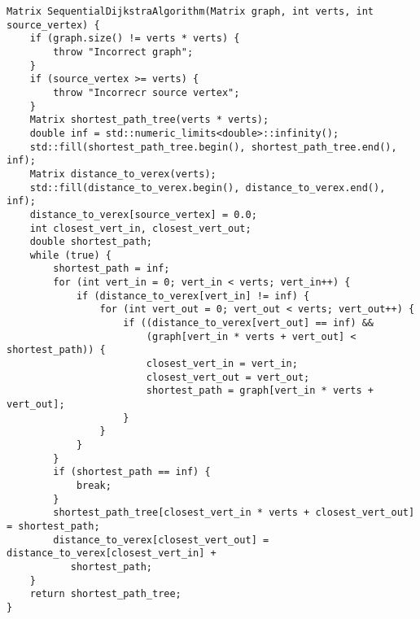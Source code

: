 \documentclass{report}
\begin{document}
\begin{lstlisting}
Matrix SequentialDijkstraAlgorithm(Matrix graph, int verts, int source_vertex) {
    if (graph.size() != verts * verts) {
        throw "Incorrect graph";
    }
    if (source_vertex >= verts) {
        throw "Incorrecr source vertex";
    }
    Matrix shortest_path_tree(verts * verts);
    double inf = std::numeric_limits<double>::infinity();
    std::fill(shortest_path_tree.begin(), shortest_path_tree.end(), inf);
    Matrix distance_to_verex(verts);
    std::fill(distance_to_verex.begin(), distance_to_verex.end(), inf);
    distance_to_verex[source_vertex] = 0.0;
    int closest_vert_in, closest_vert_out;
    double shortest_path;
    while (true) {
        shortest_path = inf;
        for (int vert_in = 0; vert_in < verts; vert_in++) {
            if (distance_to_verex[vert_in] != inf) {
                for (int vert_out = 0; vert_out < verts; vert_out++) {
                    if ((distance_to_verex[vert_out] == inf) &&
                        (graph[vert_in * verts + vert_out] < shortest_path)) {
                        closest_vert_in = vert_in;
                        closest_vert_out = vert_out;
                        shortest_path = graph[vert_in * verts + vert_out];
                    }
                }
            }
        }
        if (shortest_path == inf) {
            break;
        }
        shortest_path_tree[closest_vert_in * verts + closest_vert_out] = shortest_path;
        distance_to_verex[closest_vert_out] = distance_to_verex[closest_vert_in] +
           shortest_path;
    }
    return shortest_path_tree;
}



\end{lstlisting}
\end{document}
